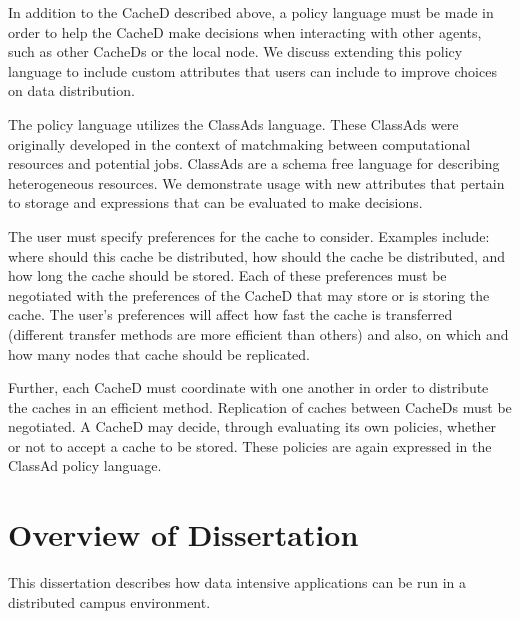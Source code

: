 In addition to the CacheD described above, a policy language must be made in order to help the CacheD make decisions when interacting with other agents, such as other CacheDs or the local node.  We discuss extending this policy language to include custom attributes that users can include to improve choices on data distribution.

The policy language utilizes the \mbox{ClassAds} \cite{raman1998matchmaking} language.  These \mbox{ClassAds} were originally developed in the context of matchmaking between computational resources and potential jobs.  ClassAds are a schema free language for describing heterogeneous resources.  We demonstrate usage with new attributes that pertain to storage and expressions that can be evaluated to make decisions.

The user must specify preferences for the cache to consider.  Examples include: where should this cache be distributed, how should the cache be distributed, and how long the cache should be stored.  Each of these preferences must be negotiated with the preferences of the CacheD that may store or is storing the cache.  The user's preferences will affect how fast the cache is transferred (different transfer methods are more efficient than others) and also, on which and how many nodes that cache should be replicated.

Further, each CacheD must coordinate with one another in order to distribute the caches in an efficient method.  Replication of caches between CacheDs must be negotiated.  A CacheD may decide, through evaluating its own policies, whether or not to accept a cache to be stored.  These policies are again expressed in the ClassAd policy language.



\section{Overview of Dissertation}

This dissertation describes how data intensive applications can be run in a distributed campus environment.

